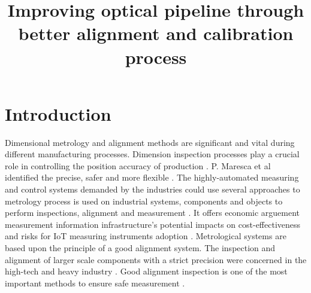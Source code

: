 \documentclass[10pt,a4paper,onecolumn]{article}
\begin{document}
	\title{Improving optical pipeline through better alignment and calibration process}
	\maketitle
	
	\section{Introduction}
	\label{intro}
	Dimensional metrology and alignment methods are significant and vital during different manufacturing processes. Dimension inspection processes play a crucial role in controlling the position accuracy of production \cite{gu2020study}. P. Maresca et al identified the precise, safer and more flexible \cite{maresca2019evaluation}. The highly-automated measuring and control systems demanded by the industries could use several approaches to metrology process is used on industrial systems, components and objects to perform inspections, alignment and measurement \cite{moru2020machine}. It offers economic arguement measurement information infrastructure's potential impacts on cost-effectiveness and risks for IoT measuring instruments adoption \cite{kuster2020measurement}. Metrological systems are based upon the principle of a good alignment system. The inspection and alignment of larger scale components with a strict precision were concerned in the high-tech and heavy industry \cite{gu2020study}. Good alignment inspection is one of the most important methods to ensure safe measurement \cite{peng2020inertial}.
	
	
	\newpage
	
	
	
	
\end{document}
